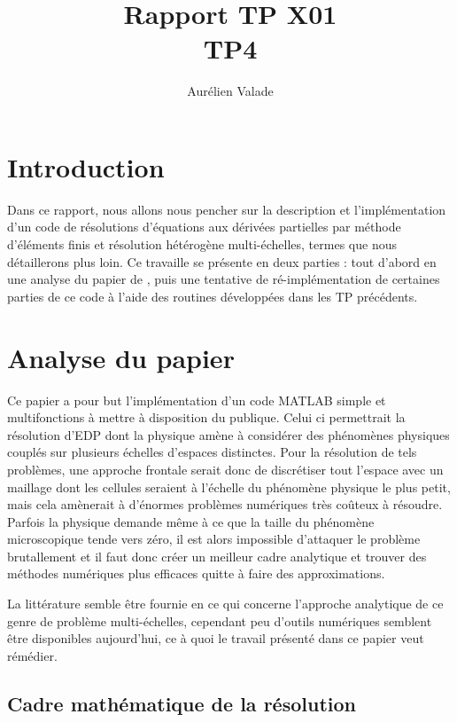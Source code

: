 \documentclass[11pt]{article}
\title{Rapport TP X01 \\ TP4}
\author{Aurélien Valade}
\date{}
\begin{document}
\maketitle

\section{Introduction}

Dans ce rapport, nous allons nous pencher sur la description et l'implémentation d'un code de résolutions d'équations aux dérivées partielles par méthode
d'éléments finis et résolution hétérogène multi-échelles, termes que nous détaillerons plus loin. Ce travaille se présente en deux parties : tout d'abord
en une analyse du papier de \cite{abdulle2009short}, puis une tentative de ré-implémentation de certaines parties de ce code à l'aide des routines développées
dans les TP précédents. 

\section{Analyse du papier}

Ce papier a pour but l'implémentation d'un code MATLAB simple et multifonctions à mettre à disposition du publique. Celui ci permettrait la résolution
d'EDP dont la physique amène à considérer des phénomènes physiques couplés sur plusieurs échelles d'espaces distinctes. Pour la résolution de tels
problèmes, une approche frontale serait donc de discrétiser tout l'espace avec un maillage dont les cellules seraient à l'échelle du phénomène physique le
plus petit, mais cela amènerait à d'énormes problèmes numériques très coûteux à résoudre. Parfois la physique demande même à ce que la taille du phénomène
microscopique tende vers zéro, il est alors impossible d'attaquer le problème brutallement et il faut donc créer un meilleur cadre analytique et trouver
des méthodes numériques plus efficaces quitte à faire des approximations.

La littérature semble être fournie en ce qui concerne l'approche analytique de ce genre de problème multi-échelles, cependant peu d'outils numériques
semblent être disponibles aujourd'hui, ce à quoi le travail présenté dans ce papier veut rémédier. 

\subsection{Cadre mathématique de la résolution}
\end{document}
